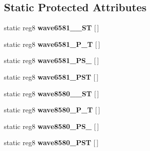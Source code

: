 \subsection*{Static Protected Attributes}
\begin{DoxyCompactItemize}
\item 
\hypertarget{classWaveformGenerator_a43ca09ef756a10d411294dec36ad39f6}{static reg8 {\bfseries wave6581\-\_\-\-\_\-\-S\-T} \mbox{[}$\,$\mbox{]}}\label{classWaveformGenerator_a43ca09ef756a10d411294dec36ad39f6}

\item 
\hypertarget{classWaveformGenerator_a4b372e396cd8ffae8b381e9f0886857b}{static reg8 {\bfseries wave6581\-\_\-\-P\-\_\-\-T} \mbox{[}$\,$\mbox{]}}\label{classWaveformGenerator_a4b372e396cd8ffae8b381e9f0886857b}

\item 
\hypertarget{classWaveformGenerator_a4858821c66411b09abe710e958aa2d72}{static reg8 {\bfseries wave6581\-\_\-\-P\-S\-\_\-} \mbox{[}$\,$\mbox{]}}\label{classWaveformGenerator_a4858821c66411b09abe710e958aa2d72}

\item 
\hypertarget{classWaveformGenerator_a992ae2d2994993f239224a13cc4368f9}{static reg8 {\bfseries wave6581\-\_\-\-P\-S\-T} \mbox{[}$\,$\mbox{]}}\label{classWaveformGenerator_a992ae2d2994993f239224a13cc4368f9}

\item 
\hypertarget{classWaveformGenerator_a6102666406144624d65afb2f5f07026b}{static reg8 {\bfseries wave8580\-\_\-\-\_\-\-S\-T} \mbox{[}$\,$\mbox{]}}\label{classWaveformGenerator_a6102666406144624d65afb2f5f07026b}

\item 
\hypertarget{classWaveformGenerator_a9ed10018f235d826431223096ae66b40}{static reg8 {\bfseries wave8580\-\_\-\-P\-\_\-\-T} \mbox{[}$\,$\mbox{]}}\label{classWaveformGenerator_a9ed10018f235d826431223096ae66b40}

\item 
\hypertarget{classWaveformGenerator_a6d0b6e9ea2d8c9fa39d30e541ff2dc21}{static reg8 {\bfseries wave8580\-\_\-\-P\-S\-\_\-} \mbox{[}$\,$\mbox{]}}\label{classWaveformGenerator_a6d0b6e9ea2d8c9fa39d30e541ff2dc21}

\item 
\hypertarget{classWaveformGenerator_ac051f58302302820a482c3e57a43f129}{static reg8 {\bfseries wave8580\-\_\-\-P\-S\-T} \mbox{[}$\,$\mbox{]}}\label{classWaveformGenerator_ac051f58302302820a482c3e57a43f129}

\end{DoxyCompactItemize}

